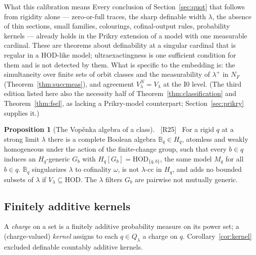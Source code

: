 \documentclass[11pt,letterpaper]{article}
\theoremstyle{definition}
\newtheorem{proposition}[definition]{Proposition}
\numberwithin{equation}{section}
\newcommand{\HOD}{\mathrm{HOD}}
\newcommand{\Izero}{\mathrm{I0}}
\newcommand{\src}[1]{\unskip\ {\normalfont\small\sffamily\color{Olive}[#1]}\ }
\begin{document}
\begin{assessment}{What this calibration means}
Every conclusion of Section~\ref{sec:quot} that follows from rigidity alone --- zero-or-full traces, the sharp definable width $\lambda$, the absence of thin sections, small families, colourings, cofinal-output rules, probability kernels --- already holds in the Prikry extension of a model with one measurable cardinal. These are theorems about definability at a singular cardinal that is regular in a $\HOD$-like model; ultraexactingness is one sufficient condition for them and is not detected by them. What is specific to the embedding is: the simultaneity over finite sets of orbit classes and the measurability of $\lambda^+$ in $N_F$ (Theorem~\ref{thm:succmeas}), and agreement $V_\lambda^{N}=V_\lambda$ at the $\Izero$ level. (The third edition listed here also the necessity half of Theorem~\ref{thm:classification} and Theorem~\ref{thm:fsel}, as lacking a Prikry-model counterpart; Section~\ref{sec:prikry} supplies it.)
\end{assessment}

\begin{proposition}[The Vop\v enka algebra of a class]\label{prop:vopenka}\src{R25}
For a rigid $q$ at a strong limit $\lambda$ there is a complete Boolean algebra $\mathbb B_q\in H_q$, atomless and weakly homogeneous under the action of the finite-change group, such that every $b\in q$ induces an $H_q$-generic $G_b$ with $H_q[G_b]=\HOD_{\{q,b\}}$, the same model $M_q$ for all $b\in q$. $\mathbb B_q$ singularizes $\lambda$ to cofinality $\omega$, is not $\lambda$-cc in $H_q$, and adds no bounded subsets of $\lambda$ if $V_\lambda\subseteq\HOD$. The $\lambda$ filters $G_b$ are pairwise not mutually generic.
\end{proposition}

\subsection{Finitely additive kernels}

A \emph{charge} on a set is a finitely additive probability measure on its power set; a (charge-valued) \emph{kernel} assigns to each $q\in Q_\lambda$ a charge on $q$. Corollary~\ref{cor:kernel} excluded definable countably additive kernels.
\end{document}
